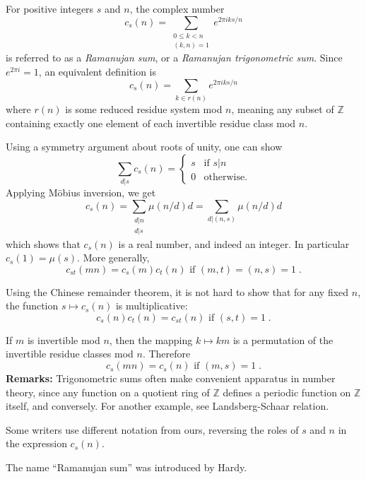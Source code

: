 \documentclass[12pt]{article}
\begin{document}
For positive integers $s$ and $n$, the complex number
$$c_s(n)=\sum_{\substack{0\le k<n \\ (k,n)=1}}e^{2\pi iks/n}$$
is referred to as a \emph{Ramanujan sum}, or a \emph{Ramanujan trigonometric sum}.
Since $e^{2\pi i}=1$, an equivalent definition is
$$c_s(n)=\sum_{k\in r(n)}e^{2\pi iks/n}$$
where $r(n)$ is some reduced residue system mod $n$, meaning any
subset of $\mathbb{Z}$ containing exactly one element of each
invertible residue class mod $n$.

Using a symmetry argument about roots of unity, one can show
$$
\sum_{d|s}c_s(n)=
\begin{cases}
s & \textrm{if $s|n$} \\ 0 & \text{otherwise.}
\end{cases}
$$
Applying M\"obius inversion, we get
$$c_s(n)=\sum_{\substack{d|n \\ d|s}}\mu(n/d)d
=\sum_{d|(n,s)}\mu(n/d)d$$
which shows that $c_s(n)$ is a real number, and indeed an integer. 
In particular $c_s(1)=\mu(s)$. More generally,
$$c_{st}(mn)=c_s(m)c_t(n)\text{ if }(m,t)=(n,s)=1\;.$$

Using the Chinese remainder theorem, it is not hard to show that
for any fixed $n$, the function $s\mapsto c_s(n)$ is multiplicative:
$$c_s(n)c_t(n)=c_{st}(n) \text{ if }(s,t)=1 \;.$$

If $m$ is invertible mod $n$, then the mapping $k\mapsto km$
is a permutation of the invertible residue classes mod $n$. Therefore
$$c_s(mn)=c_s(n)\text{ if }(m,s)=1\;.$$
\textbf{Remarks: } Trigonometric sums often make
convenient apparatus in number theory, since any
function on a quotient ring of $\mathbb{Z}$ defines
a periodic function on $\mathbb{Z}$ itself, and conversely. For
another example, see Landsberg-Schaar relation.

Some writers use different notation from ours, reversing the roles
of $s$ and $n$ in the expression $c_s(n)$.

The name ``Ramanujan sum'' was introduced by Hardy.
\end{document}

